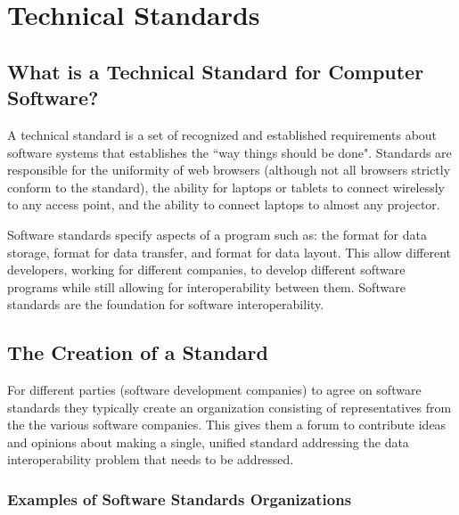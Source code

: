 \documentclass[14pt]{article}
\begin{document}
\newpage

\section{Technical Standards}
\label{sec:TechnicalStandards}

\subsection{What is a Technical Standard for Computer Software?}
\label{sec:technicalStandardsWhatIs}
A technical standard is a set of recognized and established requirements about software systems that establishes the ``way things should be done". Standards are responsible for the uniformity of web browsers (although not all browsers strictly conform to the standard), the ability for laptops or tablets to connect wirelessly to any access point, and the ability to connect laptops to almost any projector.

Software standards specify aspects of a program such as: the format for data storage, format for data transfer, and format for data layout. This allow different developers, working for different companies, to develop different software programs while still allowing for \gls{interoperability} between them. Software standards are the foundation for software \gls{interoperability}.

\subsection{The Creation of a Standard}
\label{sec:technicalStandardsCreation}
For different parties (software development companies) to agree on software standards they typically create an organization consisting of representatives from the the various software companies. This gives them a forum to contribute ideas and opinions about making a single, unified standard addressing the data \gls{interoperability} problem that needs to be addressed.

\subsubsection{Examples of Software Standards Organizations}

\end{document}
